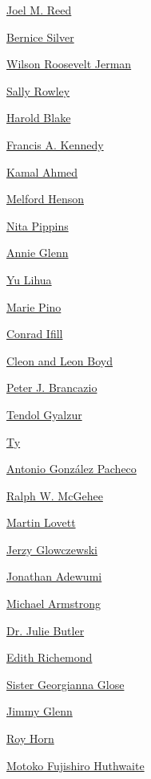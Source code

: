 \protect\hyperlink{joel-m-reed}{Joel M. Reed}

\protect\hyperlink{bernice-silver}{Bernice Silver}

\protect\hyperlink{wilson-roosevelt-jerman}{Wilson Roosevelt Jerman}

\protect\hyperlink{sally-rowley}{Sally Rowley}

\protect\hyperlink{harold-blake}{Harold Blake}

\protect\hyperlink{francis-a-kennedy}{Francis A. Kennedy}

\protect\hyperlink{kamal-ahmed}{Kamal Ahmed}

\protect\hyperlink{melford-henson}{Melford Henson}

\protect\hyperlink{nita-pippins}{Nita Pippins}

\protect\hyperlink{annie-glenn}{Annie Glenn}

\protect\hyperlink{yu-lihua}{Yu Lihua}

\protect\hyperlink{marie-pino}{Marie Pino}

\protect\hyperlink{conrad-ifill}{Conrad Ifill}

\protect\hyperlink{cleon-and-leon-boyd}{Cleon and Leon Boyd}

\protect\hyperlink{peter-j-brancazio}{Peter J. Brancazio}

\protect\hyperlink{tendol-gyalzur}{Tendol Gyalzur}

\protect\hyperlink{ty}{Ty}

\protect\hyperlink{antonio-gonzuxe1lez-pacheco}{Antonio González
Pacheco}

\protect\hyperlink{ralph-w-mcgehee}{Ralph W. McGehee}

\protect\hyperlink{martin-lovett}{Martin Lovett}

\protect\hyperlink{jerzy-glowczewski}{Jerzy Glowczewski}

\protect\hyperlink{jonathan-adewumi-}{Jonathan Adewumi}

\protect\hyperlink{michael-armstrong}{Michael Armstrong}

\protect\hyperlink{dr-julie-butler}{Dr. Julie Butler}

\protect\hyperlink{edith-richemond}{Edith Richemond}

\protect\hyperlink{sister-georgianna-glose}{Sister Georgianna Glose}

\protect\hyperlink{jimmy-glenn}{Jimmy Glenn}

\protect\hyperlink{roy-horn}{Roy Horn}

\protect\hyperlink{motoko-fujishiro-huthwaite}{Motoko Fujishiro
Huthwaite}

